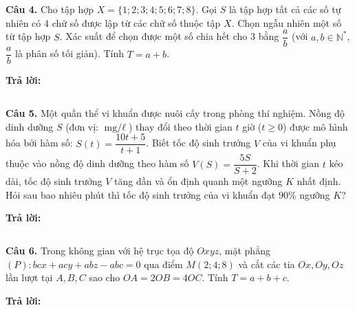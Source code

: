\documentclass[12pt,a4paper]{article}
\begin{document}
\vspace{0.2cm}
\textbf{Câu 4.} Cho tập hợp $X = \{1; 2; 3; 4; 5; 6; 7; 8\}$. Gọi $S$ là tập hợp tất cả các số tự nhiên có 4 chữ số được lập từ các chữ số thuộc tập $X$. Chọn ngẫu nhiên một số từ tập hợp $S$. Xác suất để chọn được một số chia hết cho 3 bằng $\dfrac{a}{b}$ (với $a, b \in \mathbb{N}^*$, $\dfrac{a}{b}$ là phân số tối giản). Tính $T = a + b$.

\vspace{0.1cm}
\noindent \textbf{Trả lời:} \begin{tabular}{|p{0.5cm}|p{0.5cm}|p{0.5cm}|p{0.5cm}|} \hline & & & \\ \hline \end{tabular}

\vspace{0.2cm}
\textbf{Câu 5.} Một quần thể vi khuẩn được nuôi cấy trong phòng thí nghiệm. Nồng độ dinh dưỡng $S$ (đơn vị: $\text{mg/}\ell$) thay đổi theo thời gian $t$ giờ ($t \geqslant 0$) được mô hình hóa bởi hàm số: $S(t) = \dfrac{10t + 5}{t + 1}$. Biết tốc độ sinh trưởng $V$ của vi khuẩn phụ thuộc vào nồng độ dinh dưỡng theo hàm số $V(S) = \dfrac{5S}{S + 2}$. Khi thời gian $t$ kéo dài, tốc độ sinh trưởng $V$ tăng dần và ổn định quanh một ngưỡng $K$ nhất định. Hỏi sau bao nhiêu phút thì tốc độ sinh trưởng của vi khuẩn đạt $90\%$ ngưỡng $K$?

\vspace{0.1cm}
\noindent \textbf{Trả lời:} \begin{tabular}{|p{0.5cm}|p{0.5cm}|p{0.5cm}|p{0.5cm}|} \hline & & & \\ \hline \end{tabular}

\vspace{0.2cm}
\textbf{Câu 6.} Trong không gian với hệ trục tọa độ $Oxyz$, mặt phẳng $(P)\colon bcx + acy + abz - abc = 0$ qua điểm $M(2; 4; 8)$ và cắt các tia $Ox, Oy, Oz$ lần lượt tại $A, B, C$ sao cho $OA = 2OB = 4OC$. Tính $T = a + b + c$.

\vspace{0.1cm}
\noindent \textbf{Trả lời:} \begin{tabular}{|p{0.5cm}|p{0.5cm}|p{0.5cm}|p{0.5cm}|} \hline & & & \\ \hline \end{tabular}
\end{document}
